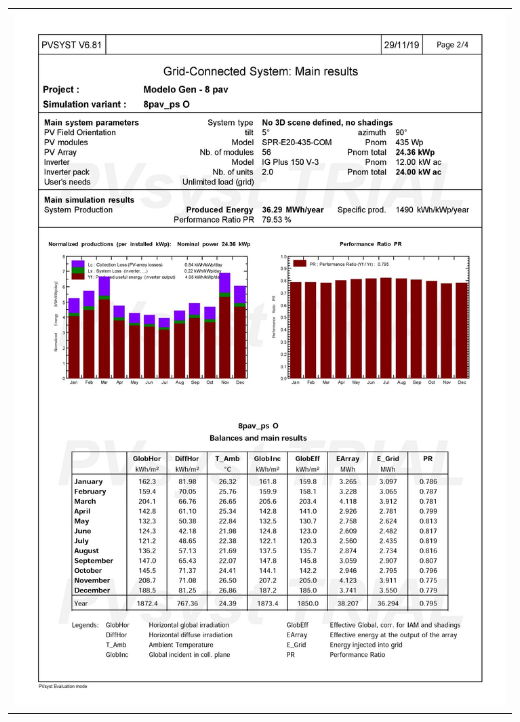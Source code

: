 \begin{table}[H]
    \centering
    \begin{tabular}{l}
        \includegraphics[width=\textwidth]{figures/attachments/resultpv20.jpg}
    \end{tabular}
\end{table}
\vspace*{-0.3cm}
